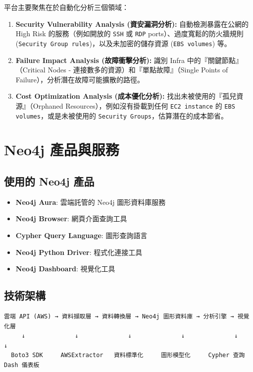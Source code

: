\documentclass[11pt,a4paper]{ctexart}
\begin{document}
平台主要聚焦在於自動化分析三個領域：

\begin{enumerate}[leftmargin=1.5em]
\item \textbf{Security Vulnerability Analysis (資安漏洞分析):} 自動檢測暴露在公網的 High Risk 的服務（例如開放的 \texttt{SSH} 或 \texttt{RDP} ports）、過度寬鬆的防火牆規則 (\texttt{Security Group rules})，以及未加密的儲存資源 (\texttt{EBS volumes}) 等。

\item \textbf{Failure Impact Analysis (故障衝擊分析):} 識別 Infra 中的『關鍵節點』（Critical Nodes - 連接數多的資源）和『單點故障』（Single Points of Failure），分析潛在故障可能擴散的路徑。

\item \textbf{Cost Optimization Analysis (成本優化分析):} 找出未被使用的『孤兒資源』（Orphaned Resources），例如沒有掛載到任何 \texttt{EC2 instance} 的 \texttt{EBS volumes}，或是未被使用的 \texttt{Security Groups}，估算潛在的成本節省。
\end{enumerate}

\section{Neo4j 產品與服務}

\subsection{使用的 Neo4j 產品}
\begin{itemize}[leftmargin=1.5em]
\item \textbf{Neo4j Aura}: 雲端託管的 Neo4j 圖形資料庫服務
\item \textbf{Neo4j Browser}: 網頁介面查詢工具
\item \textbf{Cypher Query Language}: 圖形查詢語言
\item \textbf{Neo4j Python Driver}: 程式化連接工具
\item \textbf{Neo4j Dashboard}: 視覺化工具
\end{itemize}

\subsection{技術架構}
\begin{verbatim}
雲端 API (AWS) → 資料擷取層 → 資料轉換層 → Neo4j 圖形資料庫 → 分析引擎 → 視覺化層
     ↓              ↓              ↓              ↓              ↓           ↓
  Boto3 SDK     AWSExtractor   資料標準化     圖形模型化     Cypher 查詢   Dash 儀表板
\end{verbatim}
\end{document}
